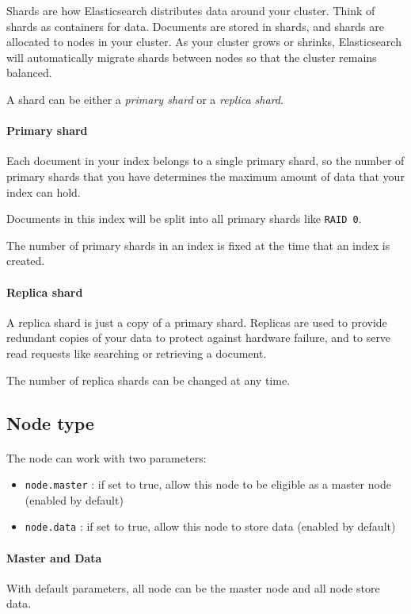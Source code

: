 \documentclass{article}%
\begin{document}
Shards are how Elasticsearch distributes data around your cluster. Think of shards as containers for data. Documents are stored in shards, and shards are allocated to nodes in your cluster. As your cluster grows or shrinks, Elasticsearch will automatically migrate shards between nodes so that the cluster remains balanced.

A shard can be either a \textit{primary shard} or a \textit{replica shard}.

\paragraph{Primary shard} Each document in your index belongs to a single primary shard, so the number of primary shards that you have determines the maximum amount of data that your index can hold.

Documents in this index will be split into all primary shards like \texttt{RAID 0}.

The number of primary shards in an index is fixed at the time that an index is created.

\paragraph{Replica shard} A replica shard is just a copy of a primary shard. Replicas are used to provide redundant copies of your data to protect against hardware failure, and to serve read requests like searching or retrieving a document.

The number of replica shards can be changed at any time.

\subsection{Node type}

\paragraph{} The node can work with two parameters:
\begin{itemize}
	\item \texttt{node.master} : if set to true, allow this node to be eligible as a master node (enabled by default)
	\item \texttt{node.data} : if set to true, allow this node to store data (enabled by default)
\end{itemize}

\paragraph{Master and Data} With default parameters, all node can be the master node and all node store data.
\end{document}
